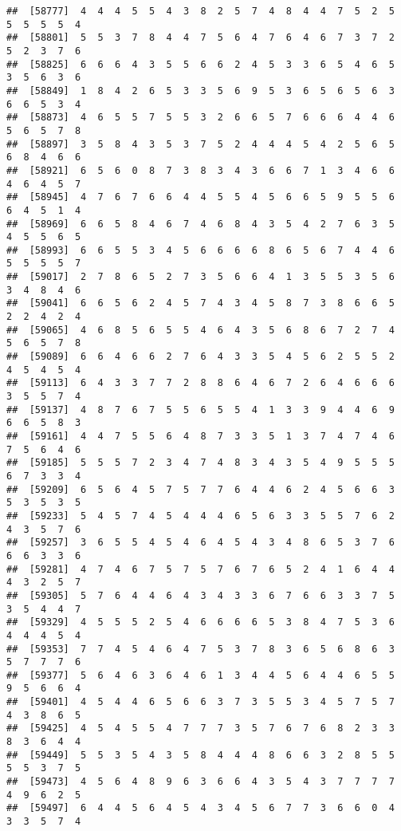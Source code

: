 \documentclass[
]{book}
\begin{document}
\begin{verbatim}
##  [58777]  4  4  4  5  5  4  3  8  2  5  7  4  8  4  4  7  5  2  5  5  5  5  5  4
##  [58801]  5  5  3  7  8  4  4  7  5  6  4  7  6  4  6  7  3  7  2  5  2  3  7  6
##  [58825]  6  6  6  4  3  5  5  6  6  2  4  5  3  3  6  5  4  6  5  3  5  6  3  6
##  [58849]  1  8  4  2  6  5  3  3  5  6  9  5  3  6  5  6  5  6  3  6  6  5  3  4
##  [58873]  4  6  5  5  7  5  5  3  2  6  6  5  7  6  6  6  4  4  6  5  6  5  7  8
##  [58897]  3  5  8  4  3  5  3  7  5  2  4  4  4  5  4  2  5  6  5  6  8  4  6  6
##  [58921]  6  5  6  0  8  7  3  8  3  4  3  6  6  7  1  3  4  6  6  4  6  4  5  7
##  [58945]  4  7  6  7  6  6  4  4  5  5  4  5  6  6  5  9  5  5  6  6  4  5  1  4
##  [58969]  6  6  5  8  4  6  7  4  6  8  4  3  5  4  2  7  6  3  5  4  5  5  6  5
##  [58993]  6  6  5  5  3  4  5  6  6  6  6  8  6  5  6  7  4  4  6  5  5  5  5  7
##  [59017]  2  7  8  6  5  2  7  3  5  6  6  4  1  3  5  5  3  5  6  3  4  8  4  6
##  [59041]  6  6  5  6  2  4  5  7  4  3  4  5  8  7  3  8  6  6  5  2  2  4  2  4
##  [59065]  4  6  8  5  6  5  5  4  6  4  3  5  6  8  6  7  2  7  4  5  6  5  7  8
##  [59089]  6  6  4  6  6  2  7  6  4  3  3  5  4  5  6  2  5  5  2  4  5  4  5  4
##  [59113]  6  4  3  3  7  7  2  8  8  6  4  6  7  2  6  4  6  6  6  3  5  5  7  4
##  [59137]  4  8  7  6  7  5  5  6  5  5  4  1  3  3  9  4  4  6  9  6  6  5  8  3
##  [59161]  4  4  7  5  5  6  4  8  7  3  3  5  1  3  7  4  7  4  6  7  5  6  4  6
##  [59185]  5  5  5  7  2  3  4  7  4  8  3  4  3  5  4  9  5  5  5  6  7  3  3  4
##  [59209]  6  5  6  4  5  7  5  7  7  6  4  4  6  2  4  5  6  6  3  5  3  5  3  5
##  [59233]  5  4  5  7  4  5  4  4  4  6  5  6  3  3  5  5  7  6  2  4  3  5  7  6
##  [59257]  3  6  5  5  4  5  4  6  4  5  4  3  4  8  6  5  3  7  6  6  6  3  3  6
##  [59281]  4  7  4  6  7  5  7  5  7  6  7  6  5  2  4  1  6  4  4  4  3  2  5  7
##  [59305]  5  7  6  4  4  6  4  3  4  3  3  6  7  6  6  3  3  7  5  3  5  4  4  7
##  [59329]  4  5  5  5  2  5  4  6  6  6  6  5  3  8  4  7  5  3  6  4  4  4  5  4
##  [59353]  7  7  4  5  4  6  4  7  5  3  7  8  3  6  5  6  8  6  3  5  7  7  7  6
##  [59377]  5  6  4  6  3  6  4  6  1  3  4  4  5  6  4  4  6  5  5  9  5  6  6  4
##  [59401]  4  5  4  4  6  5  6  6  3  7  3  5  5  3  4  5  7  5  7  4  3  8  6  5
##  [59425]  4  5  4  5  5  4  7  7  7  3  5  7  6  7  6  8  2  3  3  8  3  6  4  4
##  [59449]  5  5  3  5  4  3  5  8  4  4  4  8  6  6  3  2  8  5  5  5  5  3  7  5
##  [59473]  4  5  6  4  8  9  6  3  6  6  4  3  5  4  3  7  7  7  7  4  9  6  2  5
##  [59497]  6  4  4  5  6  4  5  4  3  4  5  6  7  7  3  6  6  0  4  3  3  5  7  4

\end{verbatim}
\end{document}
